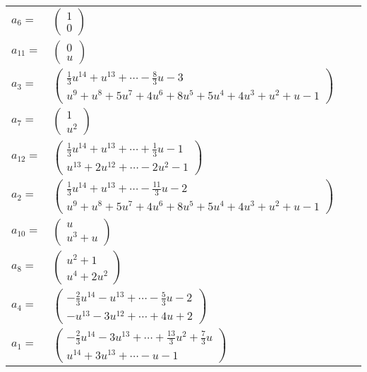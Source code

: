 \documentclass[1p]{elsarticle_modified}
\theoremstyle{definition}
\begin{document}
\begin{tabular}{m{7pt} m{180pt} m{7pt} m{180pt} }
\flushright $a_{6}=$&$\begin{pmatrix}1\\0\end{pmatrix}$ \\
\flushright $a_{11}=$&$\begin{pmatrix}0\\u\end{pmatrix}$ \\
\flushright $a_{3}=$&$\begin{pmatrix}\frac{1}{3} u^{14}+u^{13}+\cdots-\frac{8}{3} u-3\\u^9+u^8+5 u^7+4 u^6+8 u^5+5 u^4+4 u^3+u^2+u-1\end{pmatrix}$ \\
\flushright $a_{7}=$&$\begin{pmatrix}1\\u^2\end{pmatrix}$ \\
\flushright $a_{12}=$&$\begin{pmatrix}\frac{1}{3} u^{14}+u^{13}+\cdots+\frac{1}{3} u-1\\u^{13}+2 u^{12}+\cdots-2 u^2-1\end{pmatrix}$ \\
\flushright $a_{2}=$&$\begin{pmatrix}\frac{1}{3} u^{14}+u^{13}+\cdots-\frac{11}{3} u-2\\u^9+u^8+5 u^7+4 u^6+8 u^5+5 u^4+4 u^3+u^2+u-1\end{pmatrix}$ \\
\flushright $a_{10}=$&$\begin{pmatrix}u\\u^3+u\end{pmatrix}$ \\
\flushright $a_{8}=$&$\begin{pmatrix}u^2+1\\u^4+2 u^2\end{pmatrix}$ \\
\flushright $a_{4}=$&$\begin{pmatrix}-\frac{2}{3} u^{14}- u^{13}+\cdots-\frac{5}{3} u-2\\- u^{13}-3 u^{12}+\cdots+4 u+2\end{pmatrix}$ \\
\flushright $a_{1}=$&$\begin{pmatrix}-\frac{2}{3} u^{14}-3 u^{13}+\cdots+\frac{13}{3} u^2+\frac{7}{3} u\\u^{14}+3 u^{13}+\cdots- u-1\end{pmatrix}$ \\

\end{tabular}
\end{document}
